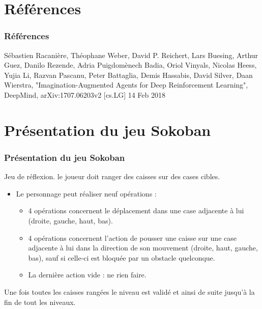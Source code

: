 \documentclass[
	11pt, %
]{beamer}
\begin{document}
\section{Références}

\begin{frame}
	\frametitle{Références}
	
	Sébastien Racanière, Théophane Weber, David P. Reichert, Lars Buesing, Arthur Guez, Danilo Rezende, Adria Puigdomènech Badia, Oriol Vinyals, Nicolas Heess, Yujia Li, Razvan Pascanu, Peter Battaglia, Demis Hassabis, David Silver, Daan Wierstra, "Imagination-Augmented Agents for Deep Reinforcement Learning", DeepMind, arXiv:1707.06203v2 [cs.LG] 14 Feb 2018
	
\end{frame}

\section{Présentation du jeu Sokoban}

\begin{frame}
	\frametitle{Présentation du jeu Sokoban}
	
	Jeu de \alert{réflexion}. le joueur doit ranger des caisses sur des cases cibles.
	\bigskip %
	
	\begin{itemize}
		\item Le personnage peut réaliser neuf opérations :
        \begin{itemize}
            \item 4 opérations concernent le déplacement dans une case adjacente à lui (droite, gauche, haut, bas).
            \item 4 opérations concernent l'action de pousser une caisse sur une case adjacente à lui dans la direction de son mouvement (droite, haut, gauche, bas), sauf si celle-ci est bloquée par un obstacle quelconque.
            \item La dernière action vide : ne rien faire.
		\end{itemize}
	\end{itemize}

	\bigskip %
	
	Une fois toutes les caisses rangées le niveau est validé et ainsi de suite jusqu'à la fin de tout les niveaux.
	
\end{frame}
\end{document}
